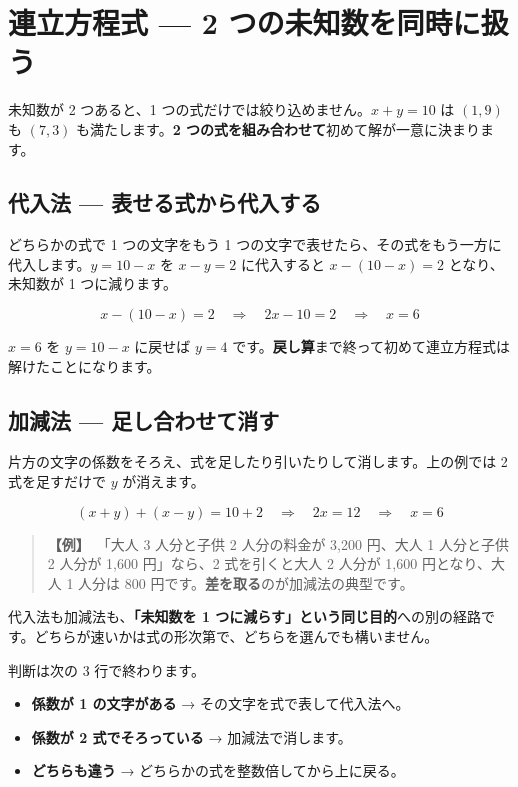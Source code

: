 \documentclass{article}
\begin{document}
\section{連立方程式 — 2 つの未知数を同時に扱う}

未知数が 2 つあると、1 つの式だけでは絞り込めません。\(x + y = 10\) は \((1, 9)\) も \((7, 3)\) も満たします。\textbf{2 つの式を組み合わせて}初めて解が一意に決まります。

\subsection{代入法 — 表せる式から代入する}

どちらかの式で 1 つの文字をもう 1 つの文字で表せたら、その式をもう一方に代入します。\(y = 10 - x\) を \(x - y = 2\) に代入すると \(x - (10 - x) = 2\) となり、未知数が 1 つに減ります。

\[ x - (10 - x) = 2 \quad \Rightarrow \quad 2x - 10 = 2 \quad \Rightarrow \quad x = 6 \]

\(x = 6\) を \(y = 10 - x\) に戻せば \(y = 4\) です。\textbf{戻し算}まで終って初めて連立方程式は解けたことになります。

\subsection{加減法 — 足し合わせて消す}

片方の文字の係数をそろえ、式を足したり引いたりして消します。上の例では 2 式を足すだけで \(y\) が消えます。

\[ (x + y) + (x - y) = 10 + 2 \quad \Rightarrow \quad 2x = 12 \quad \Rightarrow \quad x = 6 \]

\begin{quote}
\textbf{【例】}\ 「大人 3 人分と子供 2 人分の料金が 3,200 円、大人 1 人分と子供 2 人分が 1,600 円」なら、2 式を引くと大人 2 人分が 1,600 円となり、大人 1 人分は 800 円です。\textbf{差を取る}のが加減法の典型です。
\end{quote}

代入法も加減法も、\textbf{「未知数を 1 つに減らす」という同じ目的}への別の経路です。どちらが速いかは式の形次第で、どちらを選んでも構いません。

判断は次の 3 行で終わります。

\begin{itemize}
\item \textbf{係数が 1 の文字がある} → その文字を式で表して代入法へ。
\item \textbf{係数が 2 式でそろっている} → 加減法で消します。
\item \textbf{どちらも違う} → どちらかの式を整数倍してから上に戻る。
\end{itemize}
\end{document}
